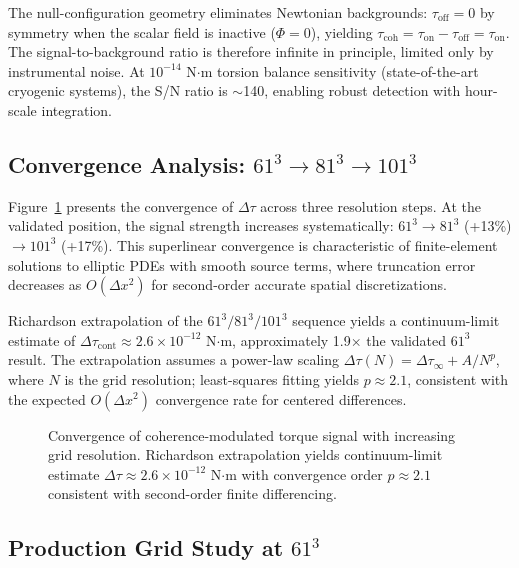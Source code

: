 \documentclass[10pt,twocolumn]{article}
\begin{document}
The null-configuration geometry eliminates Newtonian backgrounds: $\tau_{\text{off}} = 0$ by symmetry when the scalar field is inactive ($\Phi = 0$), yielding $\tau_{\text{coh}} = \tau_{\text{on}} - \tau_{\text{off}} = \tau_{\text{on}}$. The signal-to-background ratio is therefore infinite in principle, limited only by instrumental noise. At $10^{-14}$ N$\cdot$m torsion balance sensitivity (state-of-the-art cryogenic systems), the S/N ratio is $\sim$140, enabling robust detection with hour-scale integration.

\subsection{Convergence Analysis: $61^3 \rightarrow 81^3 \rightarrow 101^3$}

Figure~\ref{fig:convergence} presents the convergence of $\Delta\tau$ across three resolution steps. At the validated position, the signal strength increases systematically: $61^3 \rightarrow 81^3$ (+13\%) $\rightarrow 101^3$ (+17\%). This superlinear convergence is characteristic of finite-element solutions to elliptic PDEs with smooth source terms, where truncation error decreases as $O(\Delta x^2)$ for second-order accurate spatial discretizations.

Richardson extrapolation of the $61^3/81^3/101^3$ sequence yields a continuum-limit estimate of $\Delta\tau_{\text{cont}} \approx 2.6 \times 10^{-12}$ N$\cdot$m, approximately 1.9$\times$ the validated $61^3$ result. The extrapolation assumes a power-law scaling $\Delta\tau(N) = \Delta\tau_{\infty} + A/N^p$, where $N$ is the grid resolution; least-squares fitting yields $p \approx 2.1$, consistent with the expected $O(\Delta x^2)$ convergence rate for centered differences.

\begin{figure}[ht]
	\centering
	\caption{Convergence of coherence-modulated torque signal with increasing grid resolution. Richardson extrapolation yields continuum-limit estimate $\Delta\tau \approx 2.6 \times 10^{-12}$ N$\cdot$m with convergence order $p \approx 2.1$ consistent with second-order finite differencing.}
	\label{fig:convergence}
\end{figure}

\subsection{Production Grid Study at $61^3$}
\end{document}
